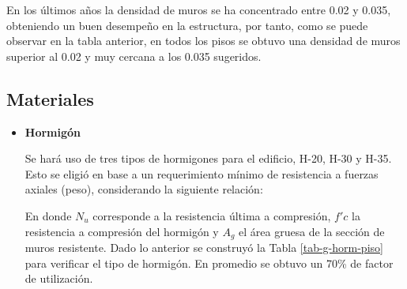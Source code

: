 En los últimos años la densidad de muros se ha concentrado entre 0.02 y 0.035, obteniendo un buen desempeño en la estructura, por tanto, como se puede observar en la tabla anterior, en todos los pisos se obtuvo una densidad de muros superior al 0.02 y muy cercana a los 0.035 sugeridos.

\newpage
\subsection{Materiales}

\begin{itemize}
    \item \textbf{Hormigón}
    
    Se hará uso de tres tipos de hormigones para el edificio, H-20, H-30 y H-35. Esto se eligió en base a un requerimiento mínimo de resistencia a fuerzas axiales (peso), considerando la siguiente relación:
    
    
    En donde $N_u$ corresponde a la resistencia última a compresión, $f'c$ la resistencia a compresión del hormigón y $A_g$ el área gruesa de la sección de muros resistente. Dado lo anterior se construyó la Tabla \ref{tab-g-horm-piso} para verificar el tipo de hormigón. En promedio se obtuvo un 70\% de factor de utilización.
    

\end{itemize}

